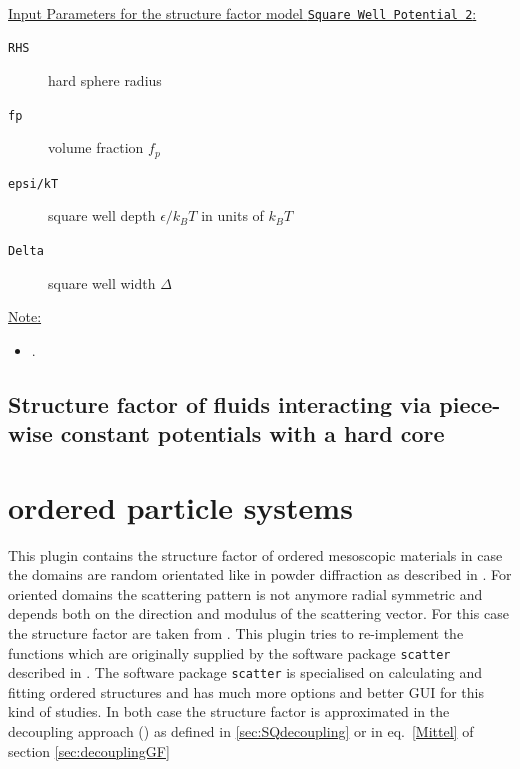 ~\\
\uline{Input Parameters for the structure factor model \texttt{Square Well Potential 2}:}
\begin{description}
\item[\texttt{RHS}] hard sphere radius
\item[\texttt{fp}] volume fraction $f_p$
\item[\texttt{epsi/kT}]square well depth $\epsilon/k_BT$ in units of $k_BT$
\item[\texttt{Delta}] square well width $\Delta$
\end{description}

\noindent\uline{Note:}
\begin{itemize}
\item .
\end{itemize}

\subsection{Structure factor of fluids interacting via piece-wise constant potentials
with a hard core}
\cite{Santos_2012,Santos_2013}

\clearpage
\section{ordered particle systems} \hspace{1pt}
\label{sec:ops}
This plugin contains the structure factor of ordered mesoscopic materials in case the domains are random orientated like in powder diffraction as described in \cite{Forster2005}. For oriented domains the scattering pattern is not anymore radial symmetric and depends both on the direction and modulus of the scattering vector. For this case the structure factor are taken from  \cite{Forster2011}. This plugin tries to re-implement the functions which are originally supplied by the software package \texttt{scatter} described in \cite{Forster2010}. The software package \texttt{scatter} is specialised on calculating and fitting ordered structures and has much more options and better GUI for this kind of studies. In both case the structure factor is approximated in the decoupling approach (\cite{Kotlarchyk1983}) as defined in \ref{sec:SQdecoupling} or in eq.\ \ref{Mittel} of section \ref{sec:decouplingGF}

